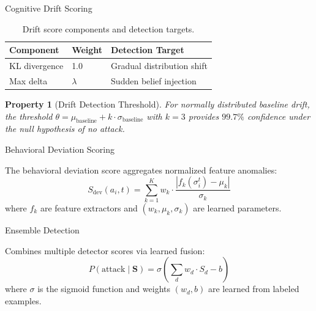 \documentclass[
  ignorenonframetext,
]{beamer}
\newtheorem{property}{Property}
\begin{document}
\begin{frame}[allowframebreaks]{Cognitive Drift Scoring}
\begin{table}[htbp]
\centering
\caption{Drift score components and detection targets.}
\label{tab:drift-components}
\begin{tabular}{@{}llp{5cm}@{}}
\toprule
Component & Weight & Detection Target \\
\midrule
KL divergence & 1.0 & Gradual distribution shift \\
Max delta & $\lambda$ & Sudden belief injection \\
\bottomrule
\end{tabular}
\end{table}

\begin{property}[Drift Detection Threshold]
\label{prop:drift-threshold}
For normally distributed baseline drift, the threshold $\theta = \mu_{\text{baseline}} + k \cdot \sigma_{\text{baseline}}$ with $k = 3$ provides $99.7\%$ confidence under the null hypothesis of no attack.
\end{property}
\end{frame}

\begin{frame}[allowframebreaks]{Behavioral Deviation Scoring}
\protect{}\label{behavioral-deviation-scoring}
\begin{definition}
\label{def:deviation-score}
The behavioral deviation score aggregates normalized feature anomalies:
\begin{equation}
\label{eq:deviation-score}
S_{\text{dev}}(a_i, t) = \sum_{k=1}^K w_k \cdot \frac{|f_k(\sigma_i^t) - \mu_k|}{\sigma_k}
\end{equation}
where $f_k$ are feature extractors and $(w_k, \mu_k, \sigma_k)$ are learned parameters.
\end{definition}
\end{frame}

\begin{frame}[allowframebreaks]{Ensemble Detection}
\protect{}\label{ensemble-detection}
\begin{definition}
\label{def:ensemble-detector}
Combines multiple detector scores via learned fusion:
\begin{equation}
\label{eq:ensemble-detector}
P(\text{attack} \mid \mathbf{S}) = \sigma\left(\sum_d w_d \cdot S_d - b\right)
\end{equation}
where $\sigma$ is the sigmoid function and weights $(w_d, b)$ are learned from labeled examples.
\end{definition}
\end{frame}
\end{document}
